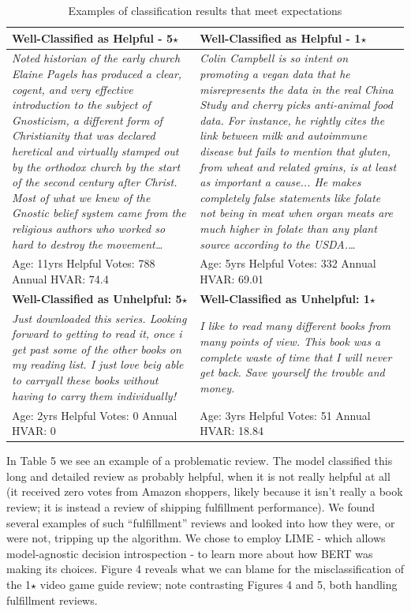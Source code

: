 \documentclass[10pt, a4paper, twocolumn]{article}
\begin{document}
\begin{table}[t]
  \centering
  \begin{tabular}{| p{8cm} | p{8cm} |}
      \hline
    \textbf{Well-Classified as Helpful - 5$\star$}  &
\textbf{Well-Classified as Helpful - 1$\star$} \\
\hline
    \textit{Noted historian of the early church Elaine Pagels has produced a clear, cogent, and very effective introduction to the subject of Gnosticism, a different form of Christianity that was declared heretical and virtually stamped out by the orthodox church by the start of the second century after Christ.  Most of what we knew of the Gnostic belief system came from the religious authors who worked so hard to destroy the movement…}  & \textit{Colin Campbell is so intent on promoting a vegan data that he misrepresents the data in the real China Study and cherry picks anti-animal food data.  For instance, he rightly cites the link between milk and autoimmune disease but fails to mention that gluten, from wheat and related grains, is at least as important a cause...  He makes completely false statements like folate not being in meat when organ meats are much higher in folate than any plant source according to the USDA.…} \\
    \hline
    Age: 11yrs   Helpful Votes: 788    Annual HVAR: 74.4
& Age: 5yrs      Helpful Votes: 332  Annual HVAR: 69.01
\\
\hline
    \textbf{Well-Classified as Unhelpful: 5$\star$}  & \textbf{Well-Classified as Unhelpful: 1$\star$} \\
    \hline
    \textit{Just downloaded this series.  Looking forward to getting to read it, once i get past some of the other books on my reading list.  I just love beig able to carryall these books without having to carry them individually!} & \textit{I like to read many different books from many points of view.  This book was a complete waste of time that I will never get back. Save yourself the trouble and money.} \\
    \hline
    Age: 2yrs   Helpful Votes: 0     Annual HVAR: 0 & Age: 3yrs   Helpful Votes: 51   Annual HVAR: 18.84\\
    \hline
  \end{tabular}
  \caption{Examples of classification results that meet expectations}
  \label{tab:1}
\end{table}

In Table 5 we see an example of a problematic review. The model classified this long and detailed review as probably helpful, when it is not really helpful at all (it received zero votes from Amazon shoppers, likely because it isn’t really a book review; it is instead a review of shipping fulfillment performance). We found several examples of such “fulfillment” reviews and looked into how they were, or were not, tripping up the algorithm. We chose to employ LIME\cite{Ribeiro_2016} - which allows model-agnostic decision introspection - to learn more about how BERT was making its choices. Figure 4 reveals what we can blame for the misclassification of the 1$\star$ video game guide review; note contrasting Figures 4 and 5, both handling fulfillment reviews.
\end{document}
